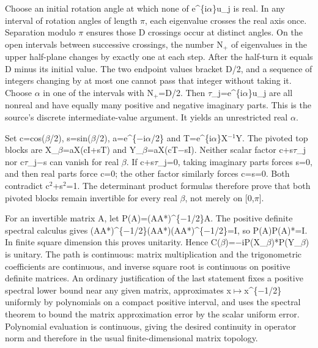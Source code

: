 \documentclass[11pt,a4paper]{article}
\begin{document}
Choose an initial rotation angle at which none of e\textasciicircum{}\{i\ensuremath{\alpha}\}u\_j is real. In any interval of rotation angles of length \ensuremath{\pi}, each eigenvalue crosses the real axis once. Separation modulo \ensuremath{\pi} ensures those D crossings occur at distinct angles. On the open intervals between successive crossings, the number N\ensuremath{_{+}} of eigenvalues in the upper half-plane changes by exactly one at each step. After the half-turn it equals D minus its initial value. The two endpoint values bracket D/2, and a sequence of integers changing by at most one cannot pass that integer without taking it. Choose \ensuremath{\alpha} in one of the intervals with N\ensuremath{_{+}}=D/2. Then \ensuremath{\tau}\_j=e\textasciicircum{}\{i\ensuremath{\alpha}\}u\_j are all nonreal and have equally many positive and negative imaginary parts. This is the source's discrete intermediate-value argument. It yields an unrestricted real \ensuremath{\alpha}.

Set c=cos(\ensuremath{\beta}/2), s=sin(\ensuremath{\beta}/2), a=e\textasciicircum{}\{\ensuremath{-}i\ensuremath{\alpha}/2\} and T=e\textasciicircum{}\{i\ensuremath{\alpha}\}X\ensuremath{^{-1}}Y. The pivoted top blocks are X\_\ensuremath{\beta}=aX(cI+sT) and Y\_\ensuremath{\beta}=aX(cT\ensuremath{-}sI). Neither scalar factor c+s\ensuremath{\tau}\_j nor c\ensuremath{\tau}\_j\ensuremath{-}s can vanish for real \ensuremath{\beta}. If c+s\ensuremath{\tau}\_j=0, taking imaginary parts forces s=0, and then real parts force c=0; the other factor similarly forces c=s=0. Both contradict c\ensuremath{^2}+s\ensuremath{^2}=1. The determinant product formulas therefore prove that both pivoted blocks remain invertible for every real \ensuremath{\beta}, not merely on [0,\ensuremath{\pi}].

For an invertible matrix A, let P(A)=(AA*)\textasciicircum{}\{\ensuremath{-}1/2\}A. The positive definite spectral calculus gives (AA*)\textasciicircum{}\{\ensuremath{-}1/2\}(AA*)(AA*)\textasciicircum{}\{\ensuremath{-}1/2\}=I, so P(A)P(A)*=I. In finite square dimension this proves unitarity. Hence C(\ensuremath{\beta})=\ensuremath{-}iP(X\_\ensuremath{\beta})*P(Y\_\ensuremath{\beta}) is unitary. The path is continuous: matrix multiplication and the trigonometric coefficients are continuous, and inverse square root is continuous on positive definite matrices. An ordinary justification of the last statement fixes a positive spectral lower bound near any given matrix, approximates x\ensuremath{\mapsto}x\textasciicircum{}\{\ensuremath{-}1/2\} uniformly by polynomials on a compact positive interval, and uses the spectral theorem to bound the matrix approximation error by the scalar uniform error. Polynomial evaluation is continuous, giving the desired continuity in operator norm and therefore in the usual finite-dimensional matrix topology.
\end{document}
